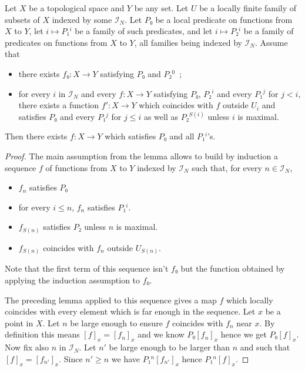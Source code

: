 \documentclass[10pt,a4paper]{article}
\newcommand{\co}{\!:}
\newcommand{\IT}[1]{\mathcal{I}_{#1}}
\newcommand{\uses}[1]{}
\newcommand{\lean}[1]{}
\newcommand{\leanok}{}
\begin{document}
\begin{lemma}
  \uses{def:index_type}
  \label{lem:inductive_construction}\uses{def:germ}\lean{inductive_construction}\leanok
  Let $X$ be a topological space and $Y$ be any set. Let $U$ be a locally
  finite family of subsets of $X$ indexed by some $\IT{N}$. Let $P₀$ be a local
  predicate on functions from $X$ to $Y$, let $i ↦ P₁^i$ be a family of such
  predicates, and let $i ↦ P₂^i$ be a family of predicates on functions from $X$ to
  $Y$, all families being indexed by $\IT{N}$. Assume that
  \begin{itemize}
    \item
      there exists $f₀ \co X → Y$ satisfying $P₀$ and $P₂^0$~;
    \item
      for every $i$ in $\IT{N}$ and every $f \co X → Y$ satisfying $P₀$, $P₂^i$
      and every $P₁^j$ for $j < i$, there exists a function $f' \co X → Y$
      which coincides with $f$ outside $U_i$ and satisfies $P₀$ and every
      $P₁^j$ for $j ≤ i$ as well as $P₂^{S(i)}$ unless $i$ is maximal.
  \end{itemize}
  Then there exists $f \co X → Y$ which satisfies $P₀$ and all $P₁^i$'s.
\end{lemma}

\begin{proof}
  \leanok\uses{lem:exists_forall_eventually_of_index_type}
  The main assumption from the lemma allows to build by induction a sequence
  $f$ of functions from $X$ to $Y$ indexed by $\IT{N}$ such that, for every $n ∈ \IT{N}$,
  \begin{itemize}
    \item $f_n$ satisfies $P₀$
    \item for every $i ≤ n$, $f_n$ satisfies $P₁^i$.
    \item $f_{S(n)}$ satisfies $P₂$ unless $n$ is maximal.
    \item $f_{S(n)}$ coincides with $f_n$ outside $U_{S(n)}$.
  \end{itemize}
  Note that the first term of this sequence isn't $f₀$ but the function obtained by
  applying the induction assumption to $f₀$.

  The preceding lemma applied to this sequence gives a map $f$ which locally
  coincides with every element which is far enough in the sequence.
  Let $x$ be a point in $X$. Let $n$ be large enough to ensure $f$ coincides with
  $f_n$ near $x$. By definition this means $[f]_x = [f_n]_x$ and we know $P₀ [f_n]_x$
  hence we get $P₀ [f]_x$. Now fix also $n$ in $\IT{N}$. Let $n'$ be large
  enough to be larger than $n$ and such that $[f]_x = [f_{n'}]_x$. Since $n' ≥ n$ we have
  $P₁^n [f_{n'}]_x$ hence $P₁^n [f]_x$.
\end{proof}
\end{document}
